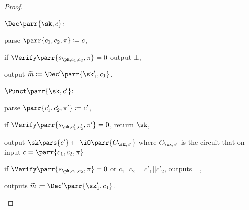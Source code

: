 \begin{proof}
\begin{sitemize}
        \item \(\Dec\parr{\sk,c}\):
        \begin{sitemize}
            \item parse \(\parr{c_1,c_2,\pi} \coloneqq c\),
            \item if \(\Verify\parr{s_{\pk,c_1,c_2},\pi} = 0\) output \(\bot\),
            \item output \(\widetilde{m} \coloneqq \Dec'\parr{\sk'_1,c_1}\).
        \end{sitemize}

        \item \(\Punct\parr{\sk, c'}\):
        \begin{sitemize}
            \item parse \(\parr{c'_1,c'_2,\pi'} \coloneqq c'\),
            \item if \(\Verify\parr{s_{\pk,c'_1,c'_2},\pi'} = 0\), return \(\sk\),
            \item output \(\sk\pars{c'} \gets \iO\parr{C_{\sk,c'}}\) where \(C_{\sk,c'}\) is the circuit that on input \(c = \parr{c_1,c_2,\pi}\)
            \begin{sitemize}
                \item if \(\Verify\parr{s_{\pk,c_1,c_2},\pi} = 0\) or \(c_1||c_2 = c'_1||c'_2\), outputs \(\bot\),
                \item outputs \(\widetilde{m} \coloneqq \Dec'\parr{\sk'_1,c_1}\).
            \end{sitemize}
        \end{sitemize}


\end{sitemize}
\end{proof}
